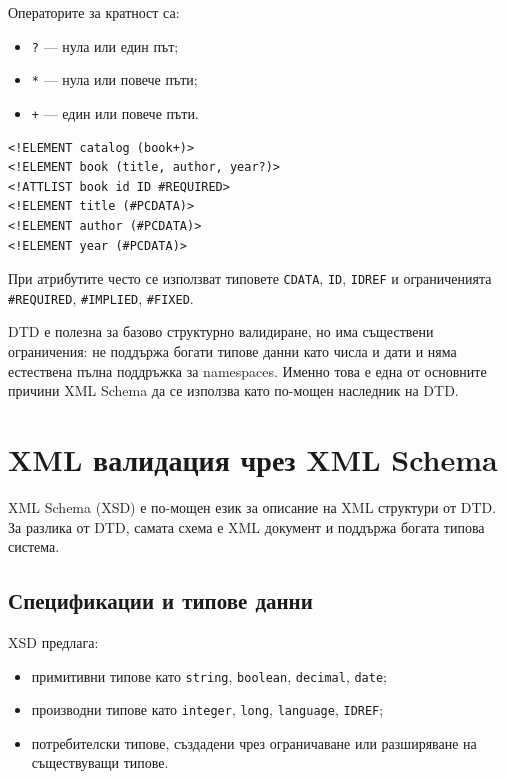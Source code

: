 \documentclass{scrartcl}
\begin{document}
\begin{FlushLeft}
Операторите за кратност са:

\begin{itemize}
    \item \texttt{?} --- нула или един път;
    \item \texttt{*} --- нула или повече пъти;
    \item \texttt{+} --- един или повече пъти.
\end{itemize}

\begin{lstlisting}[caption=DTD example]
<!ELEMENT catalog (book+)>
<!ELEMENT book (title, author, year?)>
<!ATTLIST book id ID #REQUIRED>
<!ELEMENT title (#PCDATA)>
<!ELEMENT author (#PCDATA)>
<!ELEMENT year (#PCDATA)>
\end{lstlisting}

При атрибутите често се използват типовете \texttt{CDATA}, \texttt{ID}, \texttt{IDREF} и ограниченията \texttt{\#REQUIRED}, \texttt{\#IMPLIED}, \texttt{\#FIXED}.

DTD е полезна за базово структурно валидиране, но има съществени ограничения: не поддържа богати типове данни като числа и дати и няма естествена пълна поддръжка за namespaces. Именно това е една от основните причини XML Schema да се използва като по-мощен наследник на DTD.

\section{XML валидация чрез XML Schema}

XML Schema (XSD) е по-мощен език за описание на XML структури от DTD. За разлика от DTD, самата схема е XML документ и поддържа богата типова система.

\subsection{Спецификации и типове данни}

XSD предлага:

\begin{itemize}
    \item примитивни типове като \texttt{string}, \texttt{boolean}, \texttt{decimal}, \texttt{date};
    \item производни типове като \texttt{integer}, \texttt{long}, \texttt{language}, \texttt{IDREF};
    \item потребителски типове, създадени чрез ограничаване или разширяване на съществуващи типове.
\end{itemize}


\end{FlushLeft}
\end{document}
